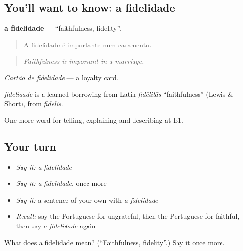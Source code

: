 \subsection*{You'll want to know: a fidelidade}
\textbf{a fidelidade} — \textquotedblleft{}faithfulness, fidelity\textquotedblright{}.

\begin{quote}
A fidelidade é importante num casamento.
\end{quote}

\begin{quote}
\emph{Faithfulness is important in a marriage.}
\end{quote}

\emph{Cartão de fidelidade} — a loyalty card.

\begin{cousinweb}
\emph{fidelidade} is a learned borrowing from Latin \emph{fidēlitās} \textquotedblleft{}faithfulness\textquotedblright{} (Lewis \& Short), from \emph{fidēlis}.
\end{cousinweb}

\begin{grammarlens}[title={What you've built}]
One more word for telling, explaining and describing at B1.
\end{grammarlens}

\subsection*{Your turn}
\begin{itemize}
\raggedright
  \item \emph{Say it:} \emph{a fidelidade}
  \item \emph{Say it:} \emph{a fidelidade}, once more
  \item \emph{Say it:} a sentence of your own with \emph{a fidelidade}
  \item \emph{Recall:} say the Portuguese for ungrateful, then the Portuguese for faithful, then say \emph{a fidelidade} again
\end{itemize}

\begin{tcolorbox}[breakable,colback=teal!4,colframe=teal!35!black,title={Before you move on}]
What does a fidelidade mean? (\textquotedblleft{}Faithfulness, fidelity\textquotedblright{}.) Say it once more.
\end{tcolorbox}
